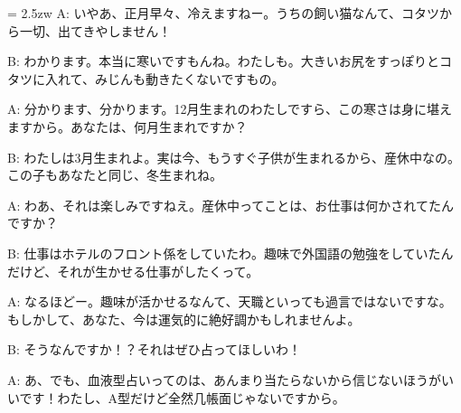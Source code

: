 \documentclass[11pt]{amsart}
\title{}
\author{}
\newenvironment{hangall}[1]{\hangindent = 2.5zw\everypar{\hangindent = 2.5zw}}{}
\begin{document}
\maketitle
\begin{hangall}{}%
A: いやあ、正月早々、冷えますねー。うちの飼い猫なんて、コタツから一切、出てきやしません！



B: わかります。本当に寒いですもんね。わたしも。大きいお尻をすっぽりとコタツに入れて、みじんも動きたくないですもの。



A: 分かります、分かります。12月生まれのわたしですら、この寒さは身に堪えますから。あなたは、何月生まれですか？



B: わたしは3月生まれよ。実は今、もうすぐ子供が生まれるから、産休中なの。この子もあなたと同じ、冬生まれね。



A: わあ、それは楽しみですねえ。産休中ってことは、お仕事は何かされてたんですか？



B: 仕事はホテルのフロント係をしていたわ。趣味で外国語の勉強をしていたんだけど、それが生かせる仕事がしたくって。



A: なるほどー。趣味が活かせるなんて、天職といっても過言ではないですな。もしかして、あなた、今は運気的に絶好調かもしれませんよ。



B: そうなんですか！？それはぜひ占ってほしいわ！



A: あ、でも、血液型占いってのは、あんまり当たらないから信じないほうがいいです！わたし、A型だけど全然几帳面じゃないですから。\end{hangall}
\end{document}
